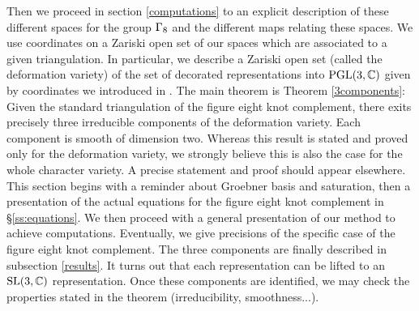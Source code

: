 Then we proceed in section \ref{computations} to an explicit description of these different spaces for the group $\Gamma_{8}$ and the different maps relating these spaces.  We use coordinates on a Zariski open set of our spaces which are associated to a given triangulation.  In particular, we describe 
a Zariski open set (called the deformation variety) of the set of decorated representations into $\textrm{PGL}(3,\mathbb{C})$ given by coordinates we introduced in \cite{BFG}.
The main theorem is  Theorem \ref{3components}: 
Given the standard triangulation of the figure eight knot  complement, there exits precisely three irreducible components of the
 deformation variety.  Each component is smooth of dimension two. Whereas this result is stated and proved only for the deformation variety, we strongly believe this is also the case for the whole character variety. A precise statement and proof should appear elsewhere.
This section begins with a reminder about Groebner basis and saturation, then a presentation of the actual equations for the figure eight knot complement in \S \ref{ss:equations}. We then proceed with a general presentation of our method to achieve computations. Eventually, we give precisions of the specific case of the figure eight knot complement.
The three components are finally described in subsection \ref{results}.  It turns out that each representation can be lifted to an $\textrm{SL}(3,\mathbb{C})$ representation. Once these components are identified, we may check the properties stated in the theorem (irreducibility, smoothness...).


